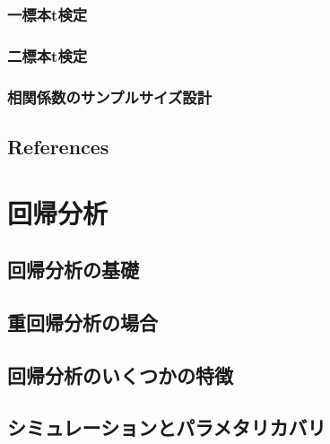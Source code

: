 \documentclass[
  a4paper,
]{ltjsbook}
\begin{document}
\subsection{一標本t検定}\label{ux4e00ux6a19ux672ctux691cux5b9a}

\subsection{二標本t検定}\label{ux4e8cux6a19ux672ctux691cux5b9a}

\subsection{相関係数のサンプルサイズ設計}\label{ux76f8ux95a2ux4fc2ux6570ux306eux30b5ux30f3ux30d7ux30ebux30b5ux30a4ux30baux8a2dux8a08}

\section{References}\label{references-9}



\chapter{回帰分析}\label{ux56deux5e30ux5206ux6790}

\section{回帰分析の基礎}\label{ux56deux5e30ux5206ux6790ux306eux57faux790e}

\section{重回帰分析の場合}\label{ux91cdux56deux5e30ux5206ux6790ux306eux5834ux5408}

\section{回帰分析のいくつかの特徴}\label{ux56deux5e30ux5206ux6790ux306eux3044ux304fux3064ux304bux306eux7279ux5fb4}

\section{シミュレーションとパラメタリカバリ}\label{ux30b7ux30dfux30e5ux30ecux30fcux30b7ux30e7ux30f3ux3068ux30d1ux30e9ux30e1ux30bfux30eaux30abux30d0ux30ea}
\end{document}
